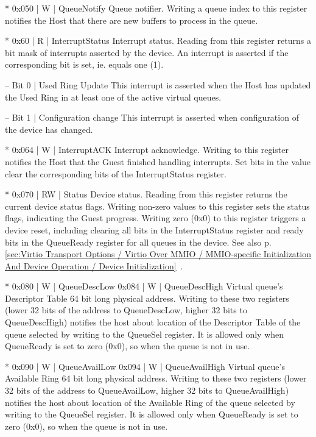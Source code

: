 * 0x050 | W | QueueNotify
  Queue notifier.
  Writing a queue index to this register notifies the Host that
  there are new buffers to process in the queue.

* 0x60 | R | InterruptStatus
  Interrupt status.
  Reading from this register returns a bit mask of interrupts
  asserted by the device. An interrupt is asserted if the
  corresponding bit is set, ie. equals one (1).

  – Bit 0 | Used Ring Update
    This interrupt is asserted when the Host has updated the Used
    Ring in at least one of the active virtual queues.

  – Bit 1 | Configuration change
    This interrupt is asserted when configuration of the device has
    changed.

* 0x064 | W | InterruptACK
  Interrupt acknowledge.
  Writing to this register notifies the Host that the Guest
  finished handling interrupts. Set bits in the value clear
  the corresponding bits of the InterruptStatus register.

* 0x070 | RW | Status
  Device status.
  Reading from this register returns the current device status
  flags.
  Writing non-zero values to this register sets the status flags,
  indicating the Guest progress. Writing zero (0x0) to this
  register triggers a device reset, including clearing all
  bits in the InterruptStatus register and ready bits in the
  QueueReady register for all queues in the device.
  See also p. \ref{sec:Virtio Transport Options / Virtio Over MMIO / MMIO-specific Initialization And Device Operation / Device Initialization}~.

* 0x080 | W | QueueDescLow
  0x084 | W | QueueDescHigh
  Virtual queue's Descriptor Table 64 bit long physical address.
  Writing to these two registers (lower 32 bits of the address
  to QueueDescLow, higher 32 bits to QueueDescHigh) notifies
  the host about location of the Descriptor Table of the queue
  selected by writing to the QueueSel register. It is allowed
  only when QueueReady is set to zero (0x0), so when the queue
  is not in use.

* 0x090 | W | QueueAvailLow
  0x094 | W | QueueAvailHigh
  Virtual queue's Available Ring 64 bit long physical address.
  Writing to these two registers (lower 32 bits of the address
  to QueueAvailLow, higher 32 bits to QueueAvailHigh) notifies
  the host about location of the Available Ring of the queue
  selected by writing to the QueueSel register. It is allowed
  only when QueueReady is set to zero (0x0), so when the queue
  is not in use.

